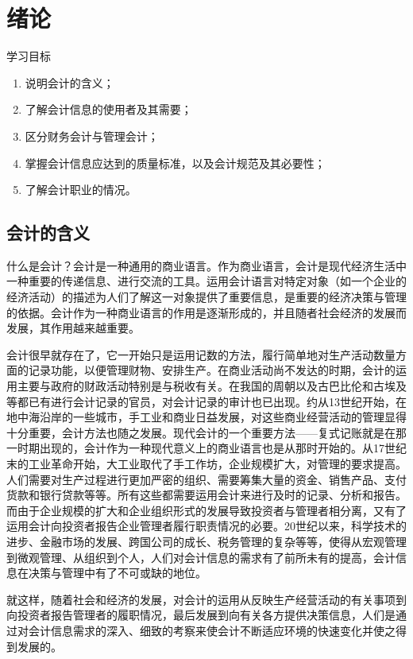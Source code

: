 \chapter{绪论}
	{\heiti 学习目标}

	\begin{enumerate}
		\item 说明会计的含义；
		\item 了解会计信息的使用者及其需要；
		\item 区分财务会计与管理会计；
		\item 掌握会计信息应达到的质量标准，以及会计规范及其必要性；
		\item 了解会计职业的情况。
	\end{enumerate}

	\section{会计的含义}
	
	什么是会计？会计是一种通用的商业语言。作为商业语言，会计是现代经济生活中一种重要的传递信息、进行交流的工具。运用会计语言对特定对象（如一个企业的经济活动）的描述为人们了解这一对象提供了重要信息，是重要的经济决策与管理的依据。会计作为一种商业语言的作用是逐渐形成的，并且随者社会经济的发展而发展，其作用越来越重要。
	
	会计很早就存在了，它一开始只是运用记数的方法，履行简单地对生产活动数量方面的记录功能，以便管理财物、安排生产。在商业活动尚不发达的时期，会计的运用主要与政府的财政活动特别是与税收有关。在我国的周朝以及古巴比伦和古埃及等都已有进行会计记录的官员，对会计记录的审计也已出现。约从13世纪开始，在地中海沿岸的一些城市，手工业和商业日益发展，对这些商业经营活动的管理显得十分重要，会计方法也随之发展。现代会计的一个重要方法——复式记账就是在那一时期出现的，会计作为一种现代意义上的商业语言也是从那时开始的。从17世纪末的工业革命开始，大工业取代了手工作坊，企业规模扩大，对管理的要求提高。人们需要对生产过程进行更加严密的组织、需要筹集大量的资金、销售产品、支付货款和银行贷款等等。所有这些都需要运用会计来进行及时的记录、分析和报告。而由于企业规模的扩大和企业组织形式的发展导致投资者与管理者相分离，又有了运用会计向投资者报告企业管理者履行职责情况的必要。20世纪以来，科学技术的进步、金融市场的发展、跨国公司的成长、税务管理的复杂等等，使得从宏观管理到微观管理、从组织到个人，人们对会计信息的需求有了前所未有的提高，会计信息在决策与管理中有了不可或缺的地位。
	
	就这样，随着社会和经济的发展，对会计的运用从反映生产经营活动的有关事项到向投资者报告管理者的履职情况，最后发展到向有关各方提供决策信息，人们是通过对会计信息需求的深入、细致的考察来使会计不断适应环境的快速变化并使之得到发展的。
	
